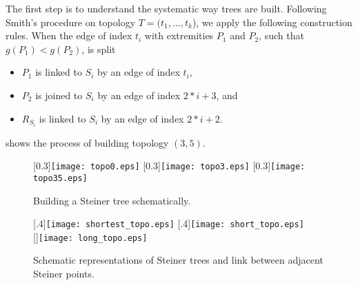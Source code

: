 \documentclass{article}
\theoremstyle{plain}
\begin{document}
The first step is to understand the systematic way trees are built. 
Following Smith's procedure on topology $T=(t_1,...,t_k$), we apply the following construction rules. When the edge of index $t_i$ with extremities $P_1$ and $P_2$, such that $g(P_1) < g(P_2)$, is split
\begin{itemize}
	\item  $P_1$ is linked to $S_i$ by an edge of index $t_i$,
	\item $P_2$ is joined to $S_i$ by an edge of index $2*i+3$, and
	\item $R_{S_i}$ is linked to $S_i$ by an edge of index $2*i+2$.
\end{itemize}
 shows the process of building topology $(3,5)$.

\begin{figure}
	\centering
		[0.3\textwidth]{\texttt{[image: topo0.eps]}} \quad
		[0.3\textwidth]{\texttt{[image: topo3.eps]}} \quad
		[0.3\textwidth]{\texttt{[image: topo35.eps]}}
	\caption{Building a Steiner tree schematically.}\label{fig:topo}
\end{figure}




\begin{figure}
	\centering
		[.4\textwidth]{\texttt{[image: shortest\_topo.eps]}} \quad
		[.4\textwidth]{\texttt{[image: short\_topo.eps]}}\\
		[\textwidth]{\texttt{[image: long\_topo.eps]}}
	\caption{Schematic representations of Steiner trees and link between adjacent Steiner points.}\label{fig:reorga}
\end{figure}
\end{document}
